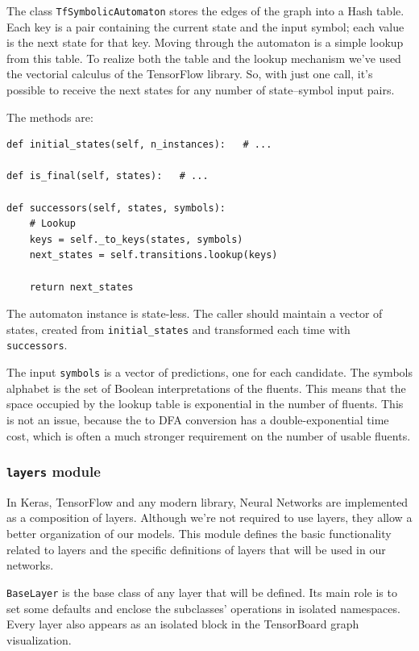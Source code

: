 The class \texttt{TfSymbolicAutomaton} stores the edges of the graph into a
Hash table. Each key is a pair containing the current state and the input
symbol; each value is the next state for that key. Moving through the
automaton is a simple lookup from this table. To realize both the table and
the lookup mechanism we've used the vectorial calculus of the TensorFlow
library. So, with just one call, it's possible to receive the next states for
any number of state--symbol input pairs.

The methods are:
\begin{lstlisting}[style=python]
def initial_states(self, n_instances):   # ...

def is_final(self, states):   # ...

def successors(self, states, symbols):
	# Lookup
	keys = self._to_keys(states, symbols)
	next_states = self.transitions.lookup(keys)
	
	return next_states
\end{lstlisting}
The automaton instance is state-less. The caller should maintain a vector of
states, created from \verb|initial_states| and transformed each time with
\texttt{successors}.

The input \texttt{symbols} is a vector of predictions, one for each candidate.
The symbols alphabet is the set of Boolean interpretations of the fluents.
This means that the space occupied by the lookup table is exponential in the
number of fluents. This is not an issue, because the \ldl{} to DFA conversion
has a double-exponential time cost, which is often a much stronger requirement
on the number of usable fluents.


\subsubsection*{\texttt{layers} module}

In Keras, TensorFlow and any modern library, Neural Networks are implemented
as a composition of layers. Although we're not required to use layers, they
allow a better organization of our models. This module defines the basic
functionality related to layers and the specific definitions of layers that
will be used in our networks.

\texttt{BaseLayer} is the base class of any layer that will be defined.
Its main role is to set some defaults and enclose the subclasses' operations
in isolated namespaces. Every layer also appears as an isolated block in the
TensorBoard graph visualization.

